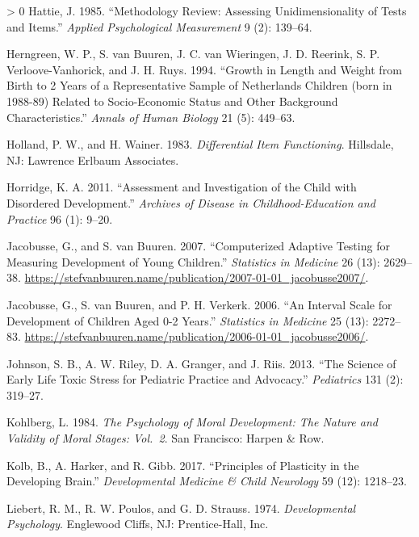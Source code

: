 \documentclass[
]{book}
\newlength{\cslhangindent}
\newenvironment{CSLReferences}[3] %
 {%
  \setlength{\parindent}{0pt}
  \ifodd #1 \everypar{\setlength{\hangindent}{\cslhangindent}}\ignorespaces\fi
  \ifnum #2 > 0
  \setlength{\parskip}{#2\baselineskip}
  \fi
 }%
 {}
\begin{document}
\begin{CSLReferences}{1}{0}
\leavevmode\hypertarget{ref-hattie1985}{}%
Hattie, J. 1985. {``Methodology Review: Assessing Unidimensionality of Tests and Items.''} \emph{Applied Psychological Measurement} 9 (2): 139--64.

\leavevmode\hypertarget{ref-herngreen1994}{}%
Herngreen, W. P., S. van Buuren, J. C. van Wieringen, J. D. Reerink, S. P. Verloove-Vanhorick, and J. H. Ruys. 1994. {``Growth in Length and Weight from Birth to 2 Years of a Representative Sample of Netherlands Children (born in 1988-89) Related to Socio-Economic Status and Other Background Characteristics.''} \emph{Annals of Human Biology} 21 (5): 449--63.

\leavevmode\hypertarget{ref-holland1983}{}%
Holland, P. W., and H. Wainer. 1983. \emph{Differential Item Functioning}. Hillsdale, NJ: Lawrence Erlbaum Associates.

\leavevmode\hypertarget{ref-horridge2011}{}%
Horridge, K. A. 2011. {``Assessment and Investigation of the Child with Disordered Development.''} \emph{Archives of Disease in Childhood-Education and Practice} 96 (1): 9--20.

\leavevmode\hypertarget{ref-jacobusse2007}{}%
Jacobusse, G., and S. van Buuren. 2007. {``Computerized Adaptive Testing for Measuring Development of Young Children.''} \emph{Statistics in Medicine} 26 (13): 2629--38. \url{https://stefvanbuuren.name/publication/2007-01-01_jacobusse2007/}.

\leavevmode\hypertarget{ref-jacobusse2006}{}%
Jacobusse, G., S. van Buuren, and P. H. Verkerk. 2006. {``An Interval Scale for Development of Children Aged 0-2 Years.''} \emph{Statistics in Medicine} 25 (13): 2272--83. \url{https://stefvanbuuren.name/publication/2006-01-01_jacobusse2006/}.

\leavevmode\hypertarget{ref-johnson2013science}{}%
Johnson, S. B., A. W. Riley, D. A. Granger, and J. Riis. 2013. {``The Science of Early Life Toxic Stress for Pediatric Practice and Advocacy.''} \emph{Pediatrics} 131 (2): 319--27.

\leavevmode\hypertarget{ref-kohlberg1984}{}%
Kohlberg, L. 1984. \emph{The Psychology of Moral Development: The Nature and Validity of Moral Stages: Vol.~2}. San Francisco: Harpen \& Row.

\leavevmode\hypertarget{ref-kolb2017principles}{}%
Kolb, B., A. Harker, and R. Gibb. 2017. {``Principles of Plasticity in the Developing Brain.''} \emph{Developmental Medicine \& Child Neurology} 59 (12): 1218--23.

\leavevmode\hypertarget{ref-liebert1974}{}%
Liebert, R. M., R. W. Poulos, and G. D. Strauss. 1974. \emph{Developmental Psychology}. Englewood Cliffs, NJ: Prentice-Hall, Inc.


\end{CSLReferences}
\end{document}

